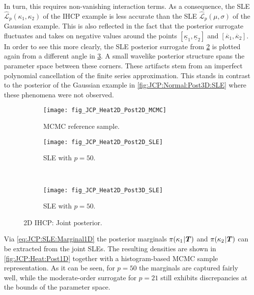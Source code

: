 In turn, this requires non-vanishing interaction terms.
As a consequence, the SLE \(\hat{\mathcal{L}}_p(\kappa_1,\kappa_2)\) of the IHCP example is less accurate than the SLE \(\hat{\mathcal{L}}_p(\mu,\sigma)\) of the Gaussian example.
This is also reflected in the fact that the posterior surrogate fluctuates and takes on negative values
around the points \([\underline{\kappa}_1,\underline{\kappa}_2]\) and \([\overline{\kappa}_1,\overline{\kappa}_2]\).
In order to see this more clearly, the SLE posterior surrogate from \cref{fig:JCP:Heat:Post2D:SLE} is plotted again from a different angle in \cref{fig:JCP:Heat:Post3D:SLE}.
A small wavelike posterior structure spans the parameter space between these corners.
These artifacts stem from an imperfect polynomial cancellation of the finite series approximation.
This stands in contrast to the posterior of the Gaussian example in \cref{fig:JCP:Normal:Post3D:SLE} where these phenomena were not observed.
\begin{figure}[htbp]
  \centering
  \begin{subfigure}[b]{\JCPsubWidth}
    \centering
    \texttt{[image: fig\_JCP\_Heat2D\_Post2D\_MCMC]}
    \caption{MCMC reference sample.}
    \label{fig:JCP:Heat:Post2D:MCMC}
  \end{subfigure}\hfill%
  \begin{subfigure}[b]{\JCPsubWidth}
    \centering
    \texttt{[image: fig\_JCP\_Heat2D\_Post2D\_SLE]}
    \caption{SLE with \(p = 50\).}
    \label{fig:JCP:Heat:Post2D:SLE}
  \end{subfigure}\\[1ex]%
  \begin{subfigure}[b]{\JCPsubWidth}
    \centering
    \texttt{[image: fig\_JCP\_Heat2D\_Post3D\_SLE]}
    \caption{SLE with \(p = 50\).}
    \label{fig:JCP:Heat:Post3D:SLE}
  \end{subfigure}%
  \caption[2D IHCP: Joint posterior]{2D IHCP: Joint posterior.}
  \label{fig:JCP:Heat:Post2D}
\end{figure}
\par %
Via \cref{eq:JCP:SLE:Marginal1D} the posterior marginals \(\pi(\kappa_1 {\:\!}|{\:\!} \bm{T})\) and \(\pi(\kappa_2 {\:\!}|{\:\!} \bm{T})\) can be extracted from the joint SLEs.
The resulting densities are shown in \cref{fig:JCP:Heat:Post1D} together with a histogram-based MCMC sample representation.
As it can be seen, for \(p = 50\) the marginals are captured fairly well,
while the moderate-order surrogate for \(p = 21\) still exhibits discrepancies at the bounds of the parameter space.
